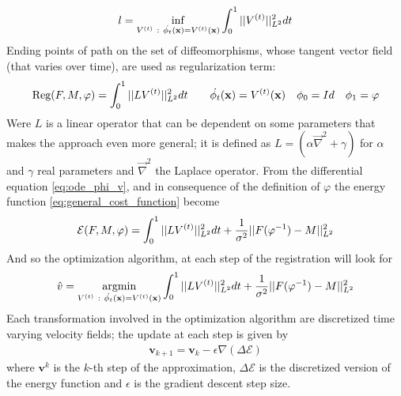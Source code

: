\begin{align*}
l = \inf_{V^{(t)} ~ : ~ \dot{\phi_{t}} (\mathbf{x}) = V^{(t)}(\mathbf{x} )}  \int_{0}^{1} \vert\lvert V^{(t)} \rvert\vert_{L^2}^{2}dt
\end{align*}
Ending points of path on the set of diffeomorphisms, whose tangent vector field (that varies over time), are used as regularization term:
\begin{align*}
\text{Reg}(F,M,\varphi) =  \int_0^1  \vert\lvert L V^{(t)}  \rvert\vert_{L^{2}}^{2}  dt
\qquad 
\dot{\phi_{t}} (\mathbf{x}) = V^{(t)}(\mathbf{x} ) 
\quad 
\phi_{0} = Id
\quad 
\phi_{1} = \varphi
\end{align*}
Were $L$ is a linear operator that can be dependent on some parameters that makes the approach even more general; it is defined as $L = (\alpha\vec \nabla^2 + \gamma)$ for $\alpha$ and $\gamma$ real parameters and $\vec \nabla^2$ the Laplace operator.
From the differential equation \ref{eq:ode_phi_v}, and in consequence of the definition of $\varphi$ the energy function \ref{eq:general_cost_function} become
\begin{align*}
\mathcal{E}(F, M, \varphi) 
= 
\int_0^1 \vert\lvert L V^{(t)}  \rvert\vert_{L^{2}}^{2} dt + \frac{1}{\sigma^2}\vert\lvert F(\varphi^{-1})  - M   \rvert\vert_{L^{2}}^{2}
\end{align*}
And so the optimization algorithm, at each step of the registration will look for
\begin{align*}
\hat{v} 
= 
\argmin_{V^{(t)} ~ : ~ \dot{\phi_{t}} (\mathbf{x}) = V^{(t)}(\mathbf{x} ) } 
\int_0^1 \euclideanMetric{L V^{(t)} }_{L^{2}}^{2} dt + \frac{1}{\sigma^2}\euclideanMetric{F(\varphi^{-1})  - M  }_{L^{2}}^{2}
\end{align*}
Each transformation involved in the optimization algorithm are discretized time varying velocity fields; the update at each step is given by
\begin{align*}
\mathbf{v}_{k+1} = \mathbf{v}_{k} - \epsilon \nabla (\Delta\mathcal{E})
\end{align*}
where $\mathbf{v}^{k}$ is the $k$-th step of the approximation, $\Delta\mathcal{E}$ is the discretized version of the energy function and $\epsilon$ is the gradient descent step size.\\

